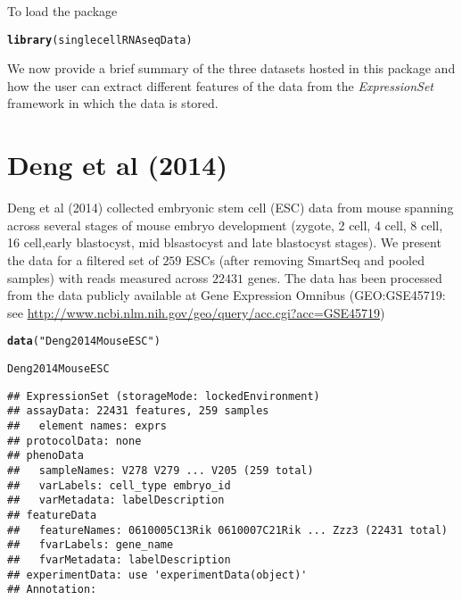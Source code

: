 \documentclass[12pt]{article}\usepackage[]{graphicx}\usepackage[usenames,dvipsnames]{color}
\makeatletter
\newcommand{\hlstr}[1]{\textcolor[rgb]{0.192,0.494,0.8}{#1}}%
\newcommand{\hlstd}[1]{\textcolor[rgb]{0.345,0.345,0.345}{#1}}%
\newcommand{\hlkwd}[1]{\textcolor[rgb]{0.737,0.353,0.396}{\textbf{#1}}}%
\newenvironment{kframe}{%
 \def\at@end@of@kframe{}%
 \ifinner\ifhmode%
  \def\at@end@of@kframe{\end{minipage}}%
  \begin{minipage}{\columnwidth}%
 \fi\fi%
 \def\FrameCommand##1{\hskip\@totalleftmargin \hskip-\fboxsep
 \colorbox{shadecolor}{##1}\hskip-\fboxsep
     \hskip-\linewidth \hskip-\@totalleftmargin \hskip\columnwidth}%
 \MakeFramed {\advance\hsize-\width
   \@totalleftmargin\z@ \linewidth\hsize
   \@setminipage}}%
 {\par\unskip\endMakeFramed%
 \at@end@of@kframe}
\newenvironment{knitrout}{}{} %
\makeatother
\begin{document}
To load the package

\begin{knitrout}
\color{fgcolor}\begin{kframe}
\begin{alltt}
\hlkwd{library}\hlstd{(singlecellRNAseqData)}
\end{alltt}
\end{kframe}
\end{knitrout}

We now provide a brief summary of the three datasets hosted in this package and
how the user can extract different features of the data from the
\textit{ExpressionSet} framework in which the data is stored.

\section{Deng et al (2014)}

Deng et al (2014) \cite{Deng2014} collected embryonic stem cell (ESC) data from
mouse spanning across several stages of mouse embryo development (zygote, 2 cell,
4 cell, 8 cell, 16 cell,early blastocyst, mid blsastocyst and late blastocyst
stages). We present the data for a filtered set of $259$ ESCs (after removing
SmartSeq and pooled samples) with reads measured across $22431$ genes. The data
has been processed from the data publicly available at Gene Expression Omnibus
(GEO:GSE45719: see \url{http://www.ncbi.nlm.nih.gov/geo/query/acc.cgi?acc=GSE45719})

\begin{knitrout}
\color{fgcolor}\begin{kframe}
\begin{alltt}
\hlkwd{data}\hlstd{(}\hlstr{"Deng2014MouseESC"}\hlstd{)}
\end{alltt}


{\ttfamily\noindent{}}\begin{alltt}
\hlstd{Deng2014MouseESC}
\end{alltt}
\begin{verbatim}
## ExpressionSet (storageMode: lockedEnvironment)
## assayData: 22431 features, 259 samples 
##   element names: exprs 
## protocolData: none
## phenoData
##   sampleNames: V278 V279 ... V205 (259 total)
##   varLabels: cell_type embryo_id
##   varMetadata: labelDescription
## featureData
##   featureNames: 0610005C13Rik 0610007C21Rik ... Zzz3 (22431 total)
##   fvarLabels: gene_name
##   fvarMetadata: labelDescription
## experimentData: use 'experimentData(object)'
## Annotation:
\end{verbatim}
\end{kframe}
\end{knitrout}
\end{document}
